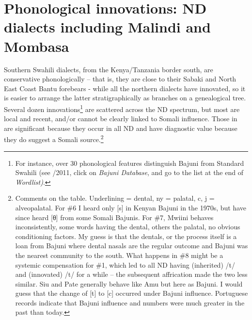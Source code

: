 \documentclass[output=paper
,newtxmath
,modfonts
,nonflat]{langsci/langscibook}
\begin{document}
\section{Phonological innovations: ND dialects including Malindi and Mombasa}\label{sec:nurse:4} Southern Swahili dialects, from the Kenya/Tanzania border south, are conservative phonologically – that is, they are close to their Sabaki and North East Coast Bantu forebears - while all the northern dialects have innovated, so it is easier to arrange the latter stratigraphically as branches on a genealogical tree. Several dozen innovations\footnote{For instance, over 30 phonological features distinguish Bajuni from Standard Swahili (see \citealt{Nurse2013}/2011, click on \textit{Bajuni Database}, and go to the list at the end of \textit{Wordlist)}.}  are scattered across the ND spectrum, but most are local and recent, and/or cannot be clearly linked to Somali influence. Those in  are significant because they occur in all ND and have diagnostic value because they do suggest a Somali source.\footnote{Comments on the table. Underlining = dental, ny = palatal, c, j = alveopalatal. For \#6 I heard only [s] in Kenyan Bajuni in the 1970s, but have since heard [θ] from some Somali Bajunis. For \#7, Mwiini behaves inconsistently, some words having the dental, others the palatal, no obvious conditioning factors. My guess is that the dentals, or the process itself is a loan from Bajuni where dental nasals are the regular outcome and Bajuni was the nearest community to the south. What happens in \#8 might be a systemic compensation for \#1, which led to all ND having (inherited) /t/ and (innovated) /t/ for a while – the subsequent affrication made the two less similar. Siu and Pate generally behave like Amu but here as Bajuni. I would guess that the change of [t] to [c] occurred under Bajuni influence. Portuguese records indicate that Bajuni influence and numbers were much greater in the past than today.}
\end{document}
